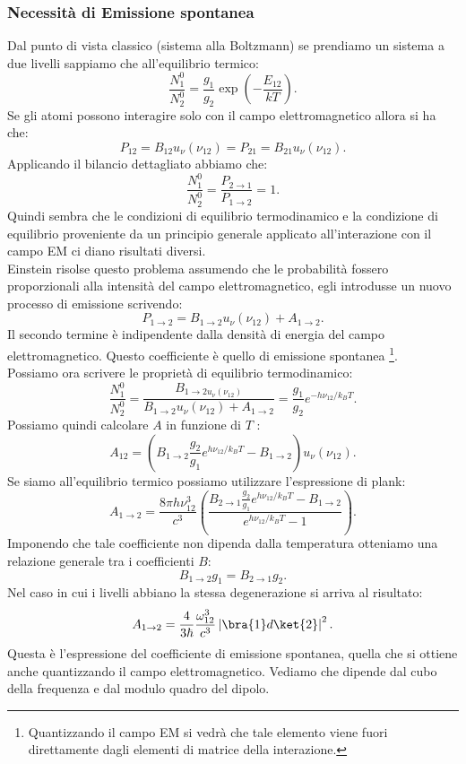 \subsubsection{Necessità di Emissione spontanea}%
Dal punto di vista classico (sistema alla Boltzmann) se prendiamo un sistema a due livelli sappiamo che all'equilibrio termico:
\[
    \frac{N_1^0}{N_2^0}= \frac{g_1}{g_2}\exp\left(-\frac{E_{12}}{kT}\right)
.\] 
Se gli atomi possono interagire solo con il campo elettromagnetico allora si ha che:
\[
    P_{12} = B_{12}u_{\nu}(\nu_{12}) =P_{21}=B_{21}u_{\nu}(\nu_{12}) 
.\] 
Applicando il bilancio dettagliato abbiamo che:
\[
\frac{N_1^0}{N_2^0} = \frac{P_{2\to 1}}{P_{1\to 2}} = 1
.\] 
Quindi sembra che le condizioni di equilibrio termodinamico e la condizione di equilibrio proveniente da un principio generale applicato all'interazione con il campo EM ci diano risultati diversi. \\
Einstein risolse questo problema assumendo che le probabilità fossero proporzionali alla intensità del campo elettromagnetico, egli introdusse un nuovo processo di emissione scrivendo:
\[
    P_{1\to 2}= B_{1\to 2}u_{\nu}(\nu_{12})  + A_{1\to 2}
.\] 
Il secondo termine è indipendente dalla densità di energia del campo elettromagnetico. Questo coefficiente è quello di emissione spontanea \footnote{Quantizzando il campo EM si vedrà che tale elemento viene fuori direttamente dagli elementi di matrice della interazione.}.\\
Possiamo ora scrivere le proprietà di equilibrio termodinamico:
\[
    \frac{N_1^0}{N_2^0} = \frac{B_{1\to 2 u_\nu(\nu_{12})}}{B_{1\to 2}u_\nu(\nu_{12}) + A_{1\to 2}} = \frac{g_1}{g_2}e^{-h\nu_{12} /k_BT}
.\] 
Possiamo quindi calcolare $A$  in funzione di $T$  :
\[
    A_{12} = \left(B_{1\to 2}\frac{g_2}{g_1}e^{h\nu_{12} /k_BT}-B_{1\to 2}\right)u_\nu(\nu_{12}) 
.\] 
Se siamo all'equilibrio termico possiamo utilizzare l'espressione di plank:
\[
A_{1\to 2} =
\frac{8\pi h\nu_{12}^3}{c^3}\left(\frac{B_{2\to 1}\frac{g_2}{g_1}e^{h\nu_{12} /k_BT}-B_{1\to 2}}{e^{h\nu_{12} /k_BT}-1}\right)
.\] 
Imponendo che tale coefficiente non dipenda dalla temperatura otteniamo una relazione generale tra i coefficienti $B$:
\[
B_{1\to 2}g_1=B_{2\to 1}g_2
.\] 
Nel caso in cui i livelli abbiano la stessa degenerazione si arriva al risultato:
\[
A_{1\to 2}=\frac{4}{3\hbar }\frac{\omega_{12}^3}{c ^3}\left|\bra{1}d\ket{2}\right|^2
.\] 
Questa è l'espressione del coefficiente di emissione spontanea, quella che si ottiene anche quantizzando il campo elettromagnetico.
Vediamo che dipende dal cubo della frequenza e dal modulo quadro del dipolo.\\
